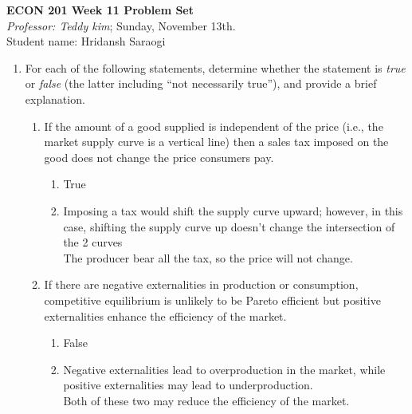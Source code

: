 \documentclass[11pt]{article}
\begin{document}
\begin{center}
\textbf{ECON 201 Week 11 Problem Set}\\
\textit {Professor: Teddy kim};  
Sunday, November 13th.
\\Student name: Hridansh Saraogi
\end{center}

\begin{enumerate}
\item For each of the following statements, determine whether
the statement is \emph{true} or \emph{false} (the latter including ``not necessarily true''), and provide a brief explanation.
    \begin{enumerate}
    \item If the amount of a good supplied is independent of the price (i.e., the market supply curve is a vertical line) then a sales tax imposed on the good does not change the price consumers pay.
    \begin{enumerate}
        \item True
        \item Imposing a tax would shift the supply curve upward; however, in this case, shifting the supply curve up doesn’t change the intersection of the 2 curves
        \\The producer bear all the tax, so the price will not change.
    \end{enumerate}

    \item If there are negative externalities in production or consumption, competitive equilibrium is unlikely to be Pareto efficient but positive externalities enhance the efficiency of the market.
	\begin{enumerate}
        \item False
        \item Negative externalities lead to overproduction in the market, while positive externalities may lead to underproduction. \\Both of these two may reduce the efficiency of the market.
    \end{enumerate}
	

\end{enumerate}
\end{enumerate}
\end{document}
